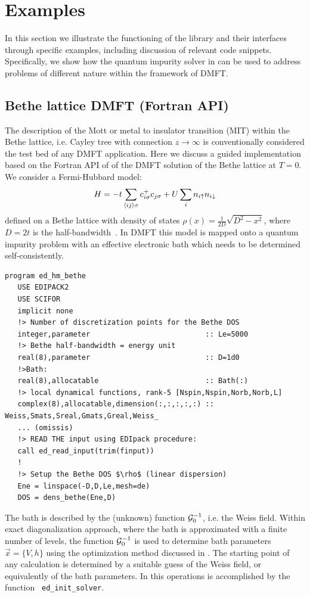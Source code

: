 \section{Examples}\label{SecExamples}
In this section we illustrate the functioning of the \NAME
library and their interfaces through specific examples, including
discussion of relevant code snippets.
Specifically, we show how the quantum impurity solver in \NAME can be used
to address problems of different nature within the framework of DMFT. 


\subsection{Bethe lattice DMFT (Fortran API)}
The description of the Mott or metal to insulator transition (MIT)
within the Bethe lattice, i.e. Cayley tree with connection
$z\to\infty$ is conventionally considered the test bed of any DMFT
application. Here  we discuss a guided implementation based on the
Fortran API of \NAME of the DMFT solution of the Bethe lattice at
$T=0$. 
We consider a Fermi-Hubbard model:
$$
H = -t \sum_{\langle ij\rangle\sigma}c^+_{i\sigma}c_{j\sigma} + U \sum_i n_{i\uparrow}n_{i\downarrow}
$$
defined on a Bethe lattice with density of states
$\rho(x)=\frac{1}{2D}\sqrt{D^2-x^2}$, where $D=2t$ is the
half-bandwidth~\cite{Georges1996}.
In DMFT this model is mapped
onto a quantum impurity problem with an effective electronic bath
which needs to be determined self-consistently.
\begin{lstlisting}[style=fstyle,numbers=none,basicstyle={\scriptsize\ttfamily}]
program ed_hm_bethe
   USE EDIPACK2
   USE SCIFOR
   implicit none
   !> Number of discretization points for the Bethe DOS
   integer,parameter                           :: Le=5000
   !> Bethe half-bandwidth = energy unit
   real(8),parameter                           :: D=1d0
   !>Bath:
   real(8),allocatable                         :: Bath(:)
   !> local dynamical functions, rank-5 [Nspin,Nspin,Norb,Norb,L]
   complex(8),allocatable,dimension(:,:,:,:,:) :: Weiss,Smats,Sreal,Gmats,Greal,Weiss_
   ... (omissis)
   !> READ THE input using EDIpack procedure:
   call ed_read_input(trim(finput))
   !
   !> Setup the Bethe DOS $\rho$ (linear dispersion)
   Ene = linspace(-D,D,Le,mesh=de)
   DOS = dens_bethe(Ene,D)
\end{lstlisting}

The bath is described
by the (unknown) function ${\cal G}^{-1}_0$, i.e. the Weiss field. Within \NAME
exact diagonalization approach, where the bath is approximated with a
finite number of levels, the function ${\cal G}^{-1}_0$ is used to
determine bath parameters $\vec{x}=\{V,h\}$ using the optimization method discussed in
.
The starting point of any calculation is determined by a suitable
guess of the Weiss field, or equivalently of the bath parameters.
In \NAME this operations is accomplished by the function {\tt
  ed\_init\_solver}.


